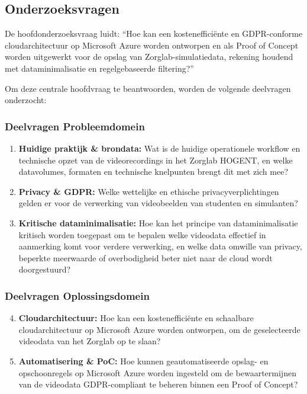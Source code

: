 \subsection{Onderzoeksvragen}%
\label{subsec:onderzoeksvragen}

De hoofdonderzoeksvraag luidt: 
“Hoe kan een kostenefficiënte en GDPR-conforme cloudarchitectuur op Microsoft Azure worden ontworpen en als Proof of Concept worden uitgewerkt voor de opslag van Zorglab-simulatiedata, rekening houdend met dataminimalisatie en regelgebaseerde filtering?”

Om deze centrale hoofdvraag te beantwoorden, worden de volgende deelvragen onderzocht:

\subsubsection*{Deelvragen Probleemdomein}
\begin{enumerate}
    \item \textbf{Huidige praktijk \& brondata:} Wat is de huidige operationele workflow en technische opzet van de videorecordings in het Zorglab HOGENT, en welke datavolumes, formaten en technische knelpunten brengt dit met zich mee?
    \item \textbf{Privacy \& GDPR:} Welke wettelijke en ethische privacyverplichtingen gelden er voor de verwerking van videobeelden van studenten en simulanten?
    \item \textbf{Kritische dataminimalisatie:} Hoe kan het principe van dataminimalisatie kritisch worden toegepast om te bepalen welke videodata effectief in aanmerking komt voor verdere verwerking, en welke data omwille van privacy, beperkte meerwaarde of overbodigheid beter niet naar de cloud wordt doorgestuurd?
\end{enumerate}

\subsubsection*{Deelvragen Oplossingsdomein}
\begin{enumerate}
    \setcounter{enumi}{3}
    \item \textbf{Cloudarchitectuur:} Hoe kan een kostenefficiënte en schaalbare cloudarchitectuur op Microsoft Azure worden ontworpen, om de geselecteerde videodata van het Zorglab op te slaan?
    \item \textbf{Automatisering \& PoC:} Hoe kunnen geautomatiseerde opslag- en opschoonregels op Microsoft Azure worden ingesteld om de bewaartermijnen van de videodata GDPR-compliant te beheren binnen een Proof of Concept?
\end{enumerate}


